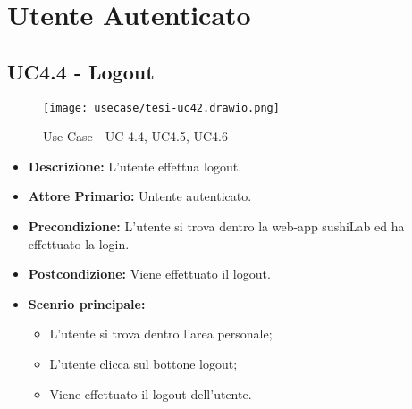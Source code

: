 \section{Utente Autenticato}
\subsection{UC4.4 - Logout}
\begin{figure}[H]
    \centering
    \texttt{[image: usecase/tesi-uc42.drawio.png]}
    \caption{Use Case - UC 4.4, UC4.5, UC4.6}
\end{figure}
\begin{itemize}
    \item \textbf{Descrizione:} L'utente effettua logout.
    \item \textbf{Attore Primario:} Untente autenticato.
    \item \textbf{Precondizione:} L'utente si trova dentro la web-app sushiLab ed ha effettuato la login.
    \item \textbf{Postcondizione:} Viene effettuato il logout.
    \item \textbf{Scenrio principale:}
    \begin{itemize}
        \item L'utente si trova dentro l'area personale;
        \item L'utente clicca sul bottone logout;
        \item Viene effettuato il logout dell'utente.
    \end{itemize}
\end{itemize}
